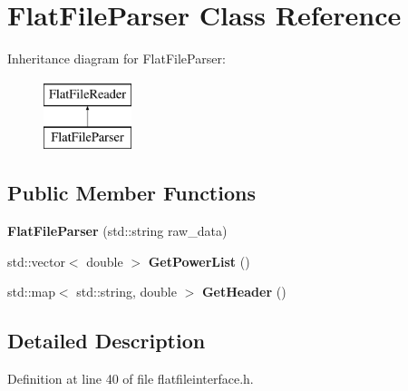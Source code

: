 \hypertarget{class_flat_file_parser}{}\section{Flat\+File\+Parser Class Reference}
\label{class_flat_file_parser}
Inheritance diagram for Flat\+File\+Parser\+:\begin{figure}[H]
\begin{center}
\leavevmode
\includegraphics[height=2.000000cm]{class_flat_file_parser}
\end{center}
\end{figure}
\subsection*{Public Member Functions}
\begin{DoxyCompactItemize}
\item 
{\bfseries Flat\+File\+Parser} (std\+::string raw\+\_\+data)\hypertarget{class_flat_file_parser_a5b1d9499abae7dcd01aff8310aa2cbac}{}\label{class_flat_file_parser_a5b1d9499abae7dcd01aff8310aa2cbac}

\item 
std\+::vector$<$ double $>$ {\bfseries Get\+Power\+List} ()\hypertarget{class_flat_file_parser_a89a4dbb69920e61263da9b0ff410f4fc}{}\label{class_flat_file_parser_a89a4dbb69920e61263da9b0ff410f4fc}

\item 
std\+::map$<$ std\+::string, double $>$ {\bfseries Get\+Header} ()\hypertarget{class_flat_file_parser_aa800cd7f2868c1635cf85475380fad14}{}\label{class_flat_file_parser_aa800cd7f2868c1635cf85475380fad14}

\end{DoxyCompactItemize}


\subsection{Detailed Description}


Definition at line 40 of file flatfileinterface.\+h.

